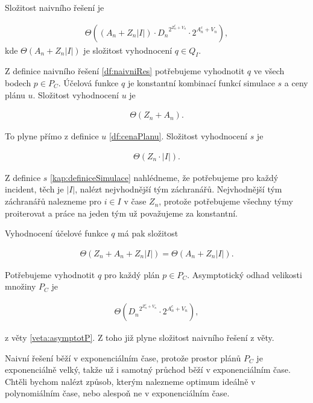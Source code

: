 \begin{veta}\label{veta:slozitostNaivRes}
  Složitost naivního řešení je

  \begin{align*}
    \Theta((A_n + Z_n |I|) \cdot {D_n}^{2^{Z^c_n + V_n}} \cdot 2^{A^c_n + V_n}),
  \end{align*}
  kde $\Theta (A_n + Z_n |I|)$ je složitost vyhodnocení $q \in Q_I$.
\end{veta}
\begin{dukaz}
  Z definice naivního řešení \ref{df:naivniRes} potřebujeme vyhodnotit $q$ ve všech bodech $p \in P_C$.
  Účelová funkce $q$ je konstantní kombinací funkcí simulace $s$ a ceny plánu $u$. Složitost vyhodnocení $u$ je

  \begin{align*}
    \Theta (Z_n + A_n).
  \end{align*}

  To plyne přímo z definice $u$ \ref{df:cenaPlanu}. Složitost vyhodnocení $s$ je

  \begin{align*}
    \Theta (Z_n \cdot |I|).
  \end{align*}

  Z definice $s$ \ref{kap:definiceSimulace} nahlédneme, že potřebujeme pro každý incident, těch je $|I|$, nalézt nejvhodnější tým záchranářů.
  Nejvhodnější tým záchranářů nalezneme pro $i \in I$ v čase $Z_n$, protože potřebujeme všechny týmy proiterovat a práce na jeden tým už považujeme za konstantní. 

  Vyhodnocení účelové funkce $q$ má pak složitost

  \begin{align*}
    \Theta (Z_n + A_n + Z_n |I|) = \Theta (A_n + Z_n |I|).
  \end{align*}

  Potřebujeme vyhodnotit $q$ pro každý plán $p \in P_C$.
  Asymptotický odhad velikosti množiny $P_C$ je 

  \begin{align*}
    \Theta ({D_n}^{2^{Z^c_n + V_n}} \cdot 2^{A^c_n + V_n}),
  \end{align*}

  z věty \ref{veta:asymptotP}. Z toho již plyne složitost naivního řešení z věty.
\end{dukaz}

Naivní řešení běží v exponenciálním čase, protože prostor plánů $P_C$ je exponenciálně velký, takže už i samotný průchod běží v exponenciálním čase.
Chtěli bychom nalézt způsob, kterým nalezneme optimum ideálně v polynomiálním čase, nebo alespoň ne v exponenciálním čase.

